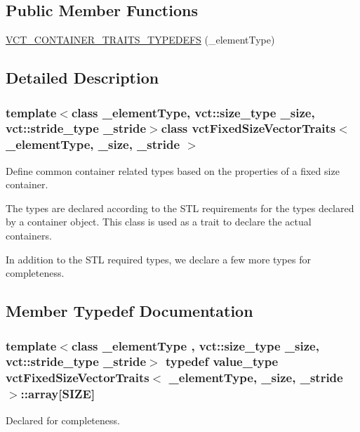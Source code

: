 \subsection*{Public Member Functions}
\begin{DoxyCompactItemize}
\item 
\hyperlink{classvct_fixed_size_vector_traits_a20cd9e1a643c4047776b3720eff1a722}{V\+C\+T\+\_\+\+C\+O\+N\+T\+A\+I\+N\+E\+R\+\_\+\+T\+R\+A\+I\+T\+S\+\_\+\+T\+Y\+P\+E\+D\+E\+F\+S} (\+\_\+element\+Type)
\end{DoxyCompactItemize}


\subsection{Detailed Description}
\subsubsection*{template$<$class \+\_\+element\+Type, vct\+::size\+\_\+type \+\_\+size, vct\+::stride\+\_\+type \+\_\+stride$>$class vct\+Fixed\+Size\+Vector\+Traits$<$ \+\_\+element\+Type, \+\_\+size, \+\_\+stride $>$}

Define common container related types based on the properties of a fixed size container. 

The types are declared according to the S\+T\+L requirements for the types declared by a container object. This class is used as a trait to declare the actual containers.

In addition to the S\+T\+L required types, we declare a few more types for completeness. 

\subsection{Member Typedef Documentation}
\hypertarget{classvct_fixed_size_vector_traits_ab86355023bee9fbca9ee14640c6b7f4e}{}
\subsubsection[{array}]{\setlength{\rightskip}{0pt plus 5cm}template$<$class \+\_\+element\+Type , vct\+::size\+\_\+type \+\_\+size, vct\+::stride\+\_\+type \+\_\+stride$>$ typedef value\+\_\+type {\bf vct\+Fixed\+Size\+Vector\+Traits}$<$ \+\_\+element\+Type, \+\_\+size, \+\_\+stride $>$\+::array\mbox{[}{\bf S\+I\+Z\+E}\mbox{]}}\label{classvct_fixed_size_vector_traits_ab86355023bee9fbca9ee14640c6b7f4e}
Declared for completeness. \hypertarget{classvct_fixed_size_vector_traits_acb808c545eef4de1bdcd7b8c4f71b1ce}{}

